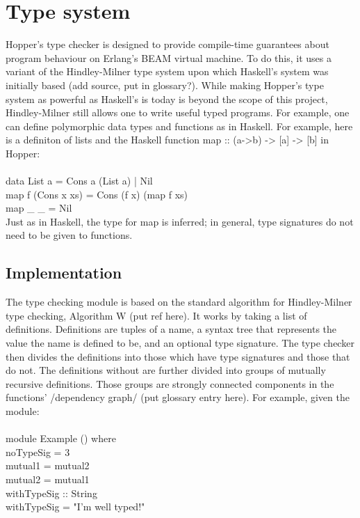 \section{Type system}
\label{sec:dai_tc}


Hopper's type checker is designed to provide compile-time guarantees about program behaviour on Erlang's BEAM virtual machine. To do this, it uses a variant of the Hindley-Milner type system upon which Haskell's system was initially based (add source, put in glossary?). While making Hopper's type system as powerful as Haskell's is today is beyond the scope of this project, Hindley-Milner still allows one to write useful typed programs. For example, one can define polymorphic data types and functions as in Haskell. For example, here is a definiton of lists and the Haskell function map :: (a->b) -> [a] -> [b] in Hopper: \\ \\
data List a = Cons a (List a) | Nil \\
map f (Cons x xs) = Cons (f x) (map f xs) \\
map \_ \_ = Nil \\ 

Just as in Haskell, the type for map is inferred; in general, type signatures do not need to be given to functions.
\subsection{Implementation}
The type checking module is based on the standard algorithm for Hindley-Milner type checking, Algorithm W (put ref here). It works by taking a list of definitions. Definitions are tuples of a name, a syntax tree that represents the value the name is defined to be, and an optional type signature. The type checker then divides the definitions into those which have type signatures and those that do not. The definitions without are further divided into groups of mutually recursive definitions. Those groups are strongly connected components in the functions' /dependency graph/ (put glossary entry here). For example, given the module: \\ \\
module Example () where \\
noTypeSig = 3 \\
mutual1 = mutual2 \\
mutual2 = mutual1 \\
withTypeSig :: String \\
withTypeSig = "I'm well typed!" \\

